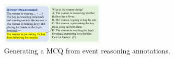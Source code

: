 

\begin{figure}
  \centering
  \includegraphics[width=0.45\textwidth]{figs/vqa_task_4.pdf}
  \caption{Generating a MCQ from event reasoning annotations.}
  \label{fig:qa_example}
\end{figure}


